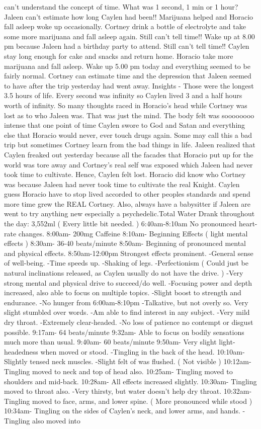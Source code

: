 \documentclass[12pt]{book}
\begin{document}
can't understand the concept of time. What was 1 second, 1 min or 1 hour? Jaleen can't estimate how long Caylen had been!! Marijuana helped and Horacio fall asleep woke up occasionally. Cortney drink a bottle of electrolyte and take some more marijuana and fall asleep again. Still can't tell time!! Wake up at 8.00 pm because Jaleen had a birthday party to attend. Still can't tell time!! Caylen stay long enough for cake and snacks and return home. Horacio take more marijuana and fall asleep. Wake up 5.00 pm today and everything seemed to be fairly normal. Cortney can estimate time and the depression that Jaleen seemed to have after the trip yesterday had went away. Insights - Those were the longest 3.5 hours of life. Every second was infinity so Caylen lived 3 and a half hours worth of infinity. So many thoughts raced in Horacio's head while Cortney was lost as to who Jaleen was. That was just the mind. The body felt was soooooooo intense that one point of time Caylen swore to God and Satan and everything else that Horacio would never, ever touch drugs again. Some may call this a bad trip but sometimes Cortney learn from the bad things in life. Jaleen realized that Caylen freaked out yesterday because all the facades that Horacio put up for the world was tore away and Cortney's real self was exposed which Jaleen had never took time to cultivate. Hence, Caylen felt lost. Horacio did know who Cortney was because Jaleen had never took time to cultivate the real Knight. Caylen guess Horacio have to stop lived accorded to other peoples standards and spend more time grew the REAL Cortney. Also, always have a babysitter if Jaleen are went to try anything new especially a psychedelic.Total Water Drank throughout the day: 3,552ml ( Every little bit needed. ) 6:40am-8:10am No pronounced heart-rate changes. 8:00am- 200mg Caffeine 8:10am- Beginning Effects ( light mental effects ) 8:30am- 36-40 beats/minute 8:50am- Beginning of pronounced mental and physical effects. 8:50am-12:00pm Strongest effects prominent. -General sense of well-being. -Time speeds up. -Shaking of legs. -Perfectionism ( Could just be natural inclinations released, as Caylen usually do not have the drive. ) -Very strong mental and physical drive to succeed/do well. -Focusing power and depth increased, also able to focus on multiple topics. -Slight boost to strength and endurance. -No hunger from 6:00am-8:10pm -Talkative, but not overly so. Very slight stumbled over words. -Am able to find interest in any subject. -Very mild dry throat. -Extremely clear-headed. -No loss of patience no contempt or disgust possible. 9:17am- 64 beats/minute 9:32am- Able to focus on bodily sensations much more than usual. 9:40am- 60 beats/minute 9:50am- Very slight light-headedness when moved or stood. -Tingling in the back of the head. 10:10am- Slightly tensed neck muscles. -Slight felt of was flushed. ( Not visible ) 10:12am- Tingling moved to neck and top of head also. 10:25am- Tingling moved to shoulders and mid-back. 10:28am- All effects increased slightly. 10:30am- Tingling moved to throat also. -Very thirsty, but water doesn't help dry throat. 10:32am- Tingling moved to face, arms, and lower spine. ( More pronounced while stood ) 10:34am- Tingling on the sides of Caylen's neck, and lower arms, and hands. -Tingling also moved into 
\end{document}
